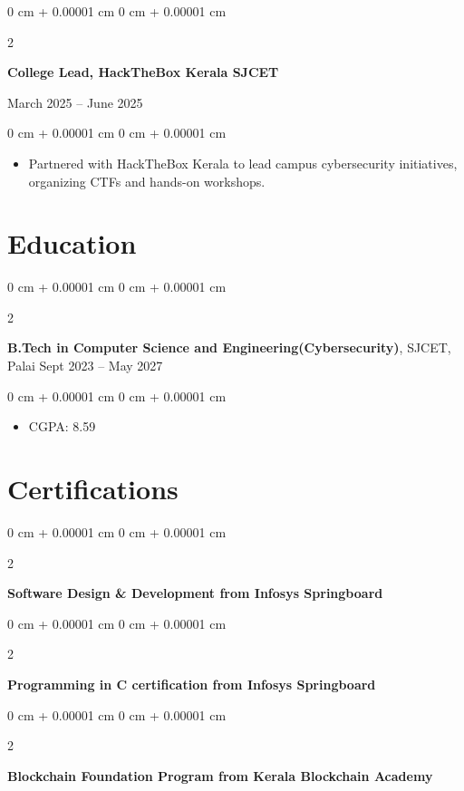 \documentclass[10pt, a4paper]{article}
\newenvironment{highlights}{
    \begin{itemize}[
        topsep=0.10 cm,
        parsep=0.10 cm,
        partopsep=0pt,
        itemsep=0pt,
        leftmargin=0 cm + 10pt
    ]
}{
    \end{itemize}
} %
\newenvironment{onecolentry}{
    \begin{adjustwidth}{
        0 cm + 0.00001 cm
    }{
        0 cm + 0.00001 cm
    }
}{
    \end{adjustwidth}
} %
\newenvironment{twocolentry}[2][]{
    \onecolentry
    \def\secondColumn{#2}
    \setcolumnwidth{\fill, 4.5 cm}
    \begin{paracol}{2}
}{
    \switchcolumn \raggedleft \secondColumn
    \end{paracol}
    \endonecolentry
} %
\begin{document}
    \vspace{0.2 cm}

\begin{twocolentry}{
    March 2025 – June 2025
}
    \textbf{College Lead, HackTheBox Kerala SJCET}
\end{twocolentry}

\vspace{0.10 cm}
\begin{onecolentry}
    \begin{highlights}
        \item Partnered with HackTheBox Kerala to lead campus cybersecurity initiatives, organizing CTFs and hands-on workshops.
    \end{highlights}
\end{onecolentry}

        \vspace{0.2 cm}

    \section{Education}
     
        \begin{twocolentry}{
            Sept 2023 – May 2027
        }
            \textbf{B.Tech in Computer Science and Engineering(Cybersecurity)}, SJCET, Palai\end{twocolentry}

        \vspace{0.10 cm}
        \begin{onecolentry}
            \begin{highlights}
                \item CGPA: 8.59
            \end{highlights}
        \end{onecolentry}

        \section{Certifications}
    
            \begin{twocolentry}{
            }
                \textbf{Software Design \& Development from Infosys Springboard}
                \end{twocolentry}

        \begin{twocolentry}{
            }
                \textbf{Programming in C certification from Infosys Springboard}
                \end{twocolentry}

        \begin{twocolentry}{
            }
                \textbf{Blockchain Foundation Program from Kerala Blockchain Academy}
                \end{twocolentry}
\end{document}
